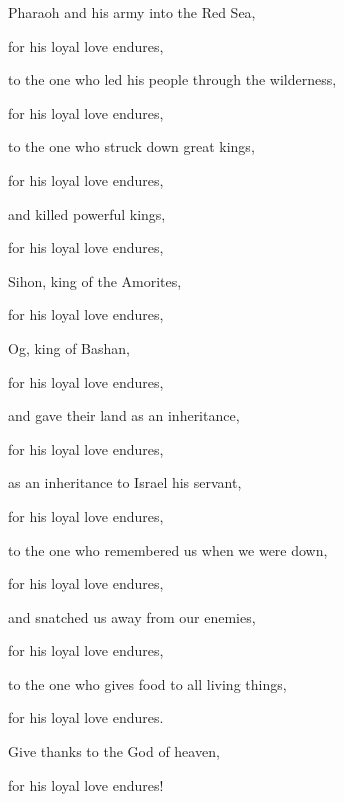 {Pharaoh
and his army
into the Red
Sea,
\par }{\Q for
his loyal love
endures,
\par }{\Q {}to the one who led
his people
through the wilderness,
\par }{\Q for
his loyal love
endures,
\par }{\Q {}to the one who struck
down great
kings,
\par }{\Q for
his loyal love
endures,
\par }{\Q {}and killed
powerful
kings,
\par }{\Q for
his loyal love
endures,
\par }{\Q {}Sihon,
king
of the Amorites,
\par }{\Q for
his loyal love
endures,
\par }{\Q {}Og,
king
of Bashan,
\par }{\Q for
his loyal love
endures,
\par }{\Q {}and gave
their land
as an inheritance,
\par }{\Q for
his loyal love
endures,
\par }{\Q {}as an inheritance
to Israel
his servant,
\par }{\Q for
his loyal love
endures,
\par }{\Q {}to the one who remembered
us when we were down,
\par }{\Q for
his loyal love
endures,
\par }{\Q {}and snatched
us away from our enemies,
\par }{\Q for
his loyal love
endures,
\par }{\Q {}to the one who gives
food
to all
living
things,

\par }{\Q for
his loyal love
endures.
\par }{\Q {}Give thanks
to the God
of heaven,
\par }{\Q for
his loyal love
endures!


\par }
